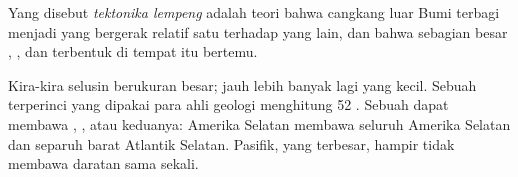 \begin{definition}\label{def:g7:plate-tectonics:plate-tectonics}
Yang disebut \emph{tektonika lempeng} adalah teori
bahwa cangkang luar Bumi terbagi menjadi  yang bergerak
relatif satu terhadap yang lain, dan bahwa sebagian besar , , dan  terbentuk di tempat  itu bertemu.
\end{definition}

\begin{remark}\label{rem:g7:plate-tectonics:how-many}
Kira-kira selusin  berukuran besar; jauh lebih banyak lagi yang
kecil. Sebuah  terperinci yang dipakai para ahli geologi menghitung 52
. Sebuah  dapat membawa , , atau keduanya:
 Amerika Selatan membawa seluruh Amerika Selatan dan separuh barat
 Atlantik Selatan.  Pasifik, yang terbesar, hampir tidak
membawa daratan sama sekali.
\end{remark}

